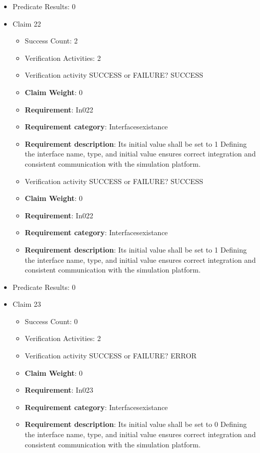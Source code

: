 \documentclass{article}
\begin{document}
\begin{itemize}
									    
				\item Predicate Results: 0

  				  \item Claim 22
				\begin{itemize}
			    	\item Success Count: 2 
			    	\item Verification Activities: 2
					\item Verification activity SUCCESS or FAILURE? SUCCESS
					\item \textbf{Claim Weight}: 0
						\item \textbf{Requirement}: In022 
						\item \textbf{Requirement category}: Interfacesexistance 
						\item \textbf{Requirement description}: Its initial value shall be set to 1 Defining the interface name, type, and initial value ensures correct integration and consistent communication with the simulation platform.
					
					\item Verification activity SUCCESS or FAILURE? SUCCESS
					\item \textbf{Claim Weight}: 0
						\item \textbf{Requirement}: In022 
						\item \textbf{Requirement category}: Interfacesexistance 
						\item \textbf{Requirement description}: Its initial value shall be set to 1 Defining the interface name, type, and initial value ensures correct integration and consistent communication with the simulation platform.
					
				\end{itemize}
				
									    
				\item Predicate Results: 0

  				  \item Claim 23
				\begin{itemize}
			    	\item Success Count: 0 
			    	\item Verification Activities: 2
					\item Verification activity SUCCESS or FAILURE? ERROR
					\item \textbf{Claim Weight}: 0
						\item \textbf{Requirement}: In023 
						\item \textbf{Requirement category}: Interfacesexistance 
						\item \textbf{Requirement description}: Its initial value shall be set to 0 Defining the interface name, type, and initial value ensures correct integration and consistent communication with the simulation platform.
					

\end{itemize}
\end{itemize}
\end{document}
